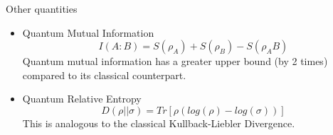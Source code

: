\begin{frame}{Other quantities}
    \begin{itemize}
        \item Quantum Mutual Information
        $$I(A:B) = S(\rho_A) + S(\rho_B) - S(\rho_AB)$$
        Quantum mutual information has a greater upper bound (by 2 times) compared to its classical counterpart.
        \item Quantum Relative Entropy
        $$D(\rho || \sigma) = Tr[\rho (log(\rho) - log(\sigma))]$$
        This is analogous to the classical Kullback-Liebler Divergence.
    \end{itemize}
\end{frame}